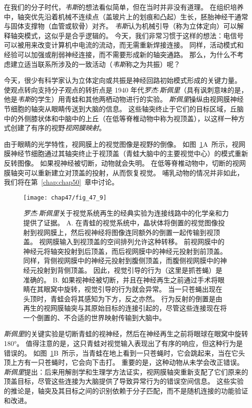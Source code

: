 在我们的分子时代，\textit{韦斯}的想法看似简单，但在当时并非没有道理。
在组织培养中，轴突优先沿着机械不连续点（盖玻片上的划痕和凸起）生长，胚胎神经干通常与固体支撑物（血管或软骨）对齐。
\textit{韦斯}认为机械引导（称为立体定向）可以解释轴突模式，这似乎是合乎逻辑的。
今天，我们非常习惯于这样的想法：电信号可以被用来改变计算机中电流的流动，而无需重新焊接连接。
同样，活动模式和经验可以加强或削弱神经连接，而不需要形成新的轴突通路。
那么，为什么不考虑建立适当联系所涉及的一致活动（\textit{韦斯}称之为共振）呢？


今天，很少有科学家认为立体定向或共振是神经回路初始模式形成的关键力量。
使观点转向支持分子观点的转折点是 1940 年代\textit{罗杰$\cdot$斯佩里}（具有讽刺意味的是，他是\textit{韦斯}的学生）用青蛙和其他两栖动物进行的实验。
\textit{斯佩里}操纵由视网膜神经节细胞的轴突从眼睛传送到大脑的信息。
这些轴突终止于它们的目标区域，丘脑中的外侧膝状体和中脑中的上丘（在低等脊椎动物中称为视顶盖），以这样一种方式创建了有序的视野\textit{视网膜映射}。


由于眼睛的光学特性，视网膜上的视觉图像是视野的倒像。
如图~\ref{fig:47_9}A~所示，视网膜神经节细胞通过其轴突终止于视顶盖（青蛙大脑中的主要视觉中心）的模式重新反转图像。
如果视神经被切断，动物就会失明。
在低等脊椎动物中，切断的视网膜轴突可以重新建立对顶盖的投射，从而恢复视觉。
哺乳动物的情况并非如此，我们将在第~\ref{chap:chap50}~章中讨论。


\begin{figure}[htbp]
	\centering
	\texttt{[image: chap47/fig\_47\_9]}
	\caption{\textit{罗杰$\cdot$斯佩里}关于视觉系统再生的经典实验为连接线路中的化学亲和力提供了证据。
		A. 在青蛙的视觉系统中，晶状体将倒置的视觉图像投射到视网膜上，然后视神经将图像连同额外的倒置一起传输到视顶盖。
		视网膜输入到视顶盖的空间排列允许这种转移。
		前视网膜中的神经元将轴突投射到后顶盖，而后视网膜中的神经元投射到前顶盖。
		同样，背侧视网膜中的神经元投射到腹侧顶盖，而腹侧视网膜中的神经元投射到背侧顶盖。
		因此，视觉引导的行为（这里是抓苍蝇）是准确的。
		B. 如果视神经被切断，并且在神经再生之前通过手术将眼睛在其眼窝中旋转，视觉引导的行为就会异常。
		当一只苍蝇出现在头顶时，青蛙会将其感知为下方，反之亦然。
		行为反射的倒置是由再生的视网膜轴突与其原始目标的连接引起的，尽管这些连接现在将一个倒置的、不合适的世界映射传输到大脑中。}
	\label{fig:47_9}
\end{figure}


\textit{斯佩里}的关键实验是切断青蛙的视神经，然后在神经再生之前将眼球在眼窝中旋转 180°。
值得注意的是，这只青蛙对视觉输入表现出了有序的响应，但这种行为是错误的。
如图~\ref{fig:47_9}B~所示，当青蛙在地上看到一只苍蝇时，它会跳起来，当在它头顶上方有一只苍蝇时，它会向下击打。
重要的是，这种动物从未学会改正错误。
\textit{斯佩里}提出：后来用解剖学和生理学方法证实，视网膜轴突重新支配了它们原来的顶盖目标，尽管这些连接为大脑提供了导致异常行为的错误空间信息。
这些实验的推论是，轴突及其目标之间的识别依赖于分子匹配，而不是随机连接的功能验证和改进。


